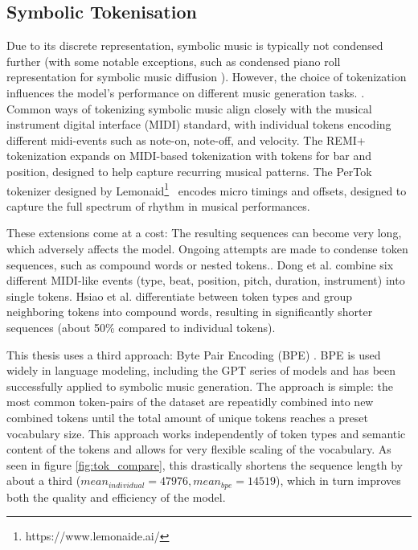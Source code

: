 \subsection{Symbolic Tokenisation} \label{symbolic tok}
Due to its discrete representation, symbolic music is typically not condensed further (with some notable exceptions, such as condensed piano roll representation for symbolic music diffusion \cite{Min_Jiang_Xia_Zhao_polyffusion_2023}\cite{Zhu_Liu_Jiang_Zheng_texture_2024}). However, the choice of tokenization influences the model's performance on different music generation tasks. \cite{Fradet_Briot_Chhel_2021}. Common ways of tokenizing symbolic music align closely with the musical instrument digital interface (MIDI) standard, with individual tokens encoding different midi-events such as note-on, note-off, and velocity. The REMI+ \cite{Huang_Yang_remi_pop_transformer_2020} tokenization expands on MIDI-based tokenization with tokens for bar and position, designed to help capture recurring musical patterns. The PerTok tokenizer designed by Lemonaid\footnote{https://www.lemonaide.ai/}  encodes micro timings and offsets, designed to capture the full spectrum of rhythm in musical performances.

These extensions come at a cost: The resulting sequences can become very long, which adversely affects the model\cite{Ji_Yang_Luo_survey_symbolic_2024}. Ongoing attempts are made to condense token sequences, such as compound words or nested tokens.\cite{Ryu_Dong_nested_2024}. Dong et al.\cite{Dong_Chen_MMT_Kirkpatrick_2023} combine six different MIDI-like events (type, beat, position, pitch, duration, instrument) into single tokens. Hsiao et al.\cite{compound_word_Hsiao_Liu_Yeh_Yang_2021} differentiate between token types and group neighboring tokens into compound words, resulting in significantly shorter sequences (about 50\% compared to individual tokens). 

This thesis uses a third approach: Byte Pair Encoding (BPE) \cite{Sennrich_Haddow_Birch_BPE_2016}. BPE is used widely in language modeling, including the GPT series of models\cite{Radford_Wu_Child_Luan_gpt2_2019} and has been successfully applied to symbolic music generation.\cite{Fradet_Gutowski_Chhel_Briot_2023} The approach is simple: the most common token-pairs of the dataset are repeatidly combined into new combined tokens until the total amount of unique tokens reaches a preset vocabulary size. This approach works independently of token types and semantic content of the tokens and allows for very flexible scaling of the vocabulary. As seen in figure \ref{fig:tok_compare}, this drastically shortens the sequence length by about a third ($mean_{individual}=47976, mean_{bpe}=14519$), which in turn improves both the quality and efficiency of the model. 

